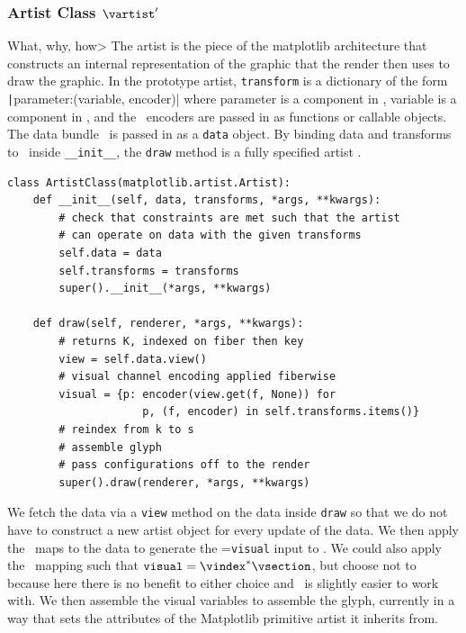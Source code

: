 \documentclass[../main.tex]{subfiles}
\begin{document}
\subsubsection{Artist Class $\vartist^{\prime}$}
What, why, how>
The artist is the piece of the matplotlib architecture that constructs an internal representation of the graphic that the render then uses to draw the graphic. In the prototype artist, \texttt{transform} is a dictionary of the form \texttt|{parameter:(variable, encoder)}| where parameter is a component in \vfiber, variable is a component in \dfiber,  and the \vchannel\ encoders are passed in as functions or callable objects. The data bundle \vtotal\ is passed in as a \texttt{data} object. By binding data and transforms to \vartisteq\ inside \texttt{__init__}, the \texttt{draw} method is a fully specified artist \vartist. 
\begin{verbatim}
class ArtistClass(matplotlib.artist.Artist):
    def __init__(self, data, transforms, *args, **kwargs):
        # check that constraints are met such that the artist 
        # can operate on data with the given transforms
        self.data = data 
        self.transforms = transforms
        super().__init__(*args, **kwargs)

    def draw(self, renderer, *args, **kwargs):
        # returns K, indexed on fiber then key 
        view = self.data.view() 
        # visual channel encoding applied fiberwise 
        visual = {p: encoder(view.get(f, None)) for 
                     p, (f, encoder) in self.transforms.items()}
        # reindex from k to s
        # assemble glyph              
        # pass configurations off to the render
        super().draw(renderer, *args, **kwargs)
\end{verbatim}
We fetch the data via a \texttt{view} method on the data inside \texttt{draw} so that we do not have to construct a new artist object for every update of the data. We then apply the \vchannel\ maps to the data to generate the \vsection=\texttt{visual} input to \vmark. We could also apply the \vindex\ mapping such that $\texttt{visual}=\vindex^*\vsection$, but choose not to because here there is no benefit to either choice and \vsection\ is slightly easier to work with. We then assemble the visual variables to assemble the glyph, currently in a way that sets the attributes of the Matplotlib primitive artist it inherits from. 
\end{document}
